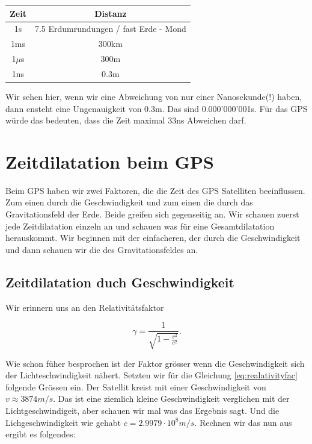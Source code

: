 \begin{refsection}
\begin{center}
\begin{tabular}{| c | c |}
\hline
Zeit & Distanz \\
\hline
1s & 7.5 Erdumrundungen / fast Erde - Mond \\
\hline
1ms & 300km \\
\hline
1$\mu$s & 300m \\
\hline
1ns & 0.3m \\
\hline
\end{tabular}
\end{center}

\noindent{}Wir sehen hier, wenn wir eine Abweichung von nur einer Nanosekunde(!) haben, dann ensteht eine Ungenauigkeit von 0.3m. Das sind 0.000'000'001s. Für das GPS würde das bedeuten, dass die Zeit maximal 33ns Abweichen darf.

\section{Zeitdilatation beim GPS}
Beim GPS haben wir zwei Faktoren, die die Zeit des GPS Satelliten beeinflussen. Zum einen durch die Geschwindigkeit und zum einen die durch das Gravitationsfeld der Erde. Beide greifen sich gegenseitig an. Wir schauen zuerst jede Zeitdilatation einzeln an und schauen was für eine Gesamtdilatation herauskommt. Wir beginnen mit der einfacheren, der durch die Geschwindigkeit und dann schauen wir die des Gravitationsfeldes an.

\subsection{Zeitdilatation duch Geschwindigkeit}
Wir erinnern uns an den Relativitätsfaktor

\begin{equation}
\label{eq:realativityfac}
\gamma = \frac{1}{\sqrt{1 - \frac{v^2}{c^2}}}.
\end{equation}

\noindent{}Wie schon füher besprochen ist der Faktor grösser wenn die Geschwindigkeit sich der Lichteschwindigkeit nähert. Setzten wir für die Gleichung \ref{eq:realativityfac} folgende Grössen ein. Der Satellit kreist mit einer Geschwindigkeit von \(v \approx 3874 m/s \). Das ist eine ziemlich kleine Geschwindigkeit verglichen mit der Lichtgeschwindigeit, aber schauen wir mal was das Ergebnis sagt. Und die Lichgeschwindigkeit wie gehabt \(c = 2.9979 \cdot 10^8 m/s\). 
Rechnen wir das nun aus ergibt es folgendes:\\


\end{refsection}
